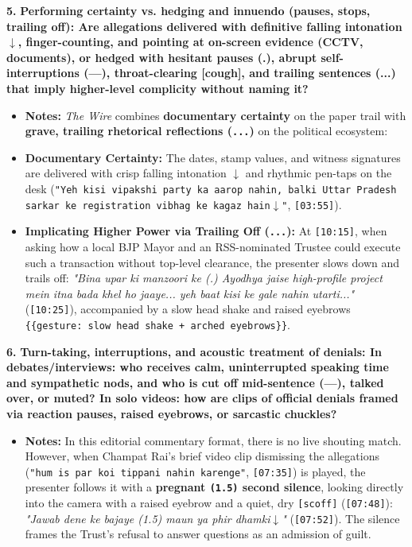 \documentclass[10pt,a4paper]{article}
\begin{document}
\noindent\textbf{5.} \textbf{Performing certainty vs. hedging and innuendo (pauses, stops, trailing off): Are allegations delivered with definitive falling intonation $\downarrow$, finger-counting, and pointing at on-screen evidence (CCTV, documents), or hedged with hesitant pauses (.), abrupt self-interruptions (---), throat-clearing [cough], and trailing sentences (...) that imply higher-level complicity without naming it?}\par\smallskip
\begin{itemize}
  \item \textbf{Notes:}
\textit{The Wire} combines \textbf{documentary certainty} on the paper trail with \textbf{grave, trailing rhetorical reflections (\texttt{...})} on the political ecosystem:\par\smallskip
  \item \textbf{Documentary Certainty:} The dates, stamp values, and witness signatures are delivered with crisp falling intonation \texttt{$\downarrow$} and rhythmic pen-taps on the desk (\texttt{"Yeh kisi vipakshi party ka aarop nahin, balki Uttar Pradesh sarkar ke registration vibhag ke kagaz hain$\downarrow$"}, \texttt{[03:55]}).
  \item \textbf{Implicating Higher Power via Trailing Off (\texttt{...}):} At \texttt{[10:15]}, when asking how a local BJP Mayor and an RSS-nominated Trustee could execute such a transaction without top-level clearance, the presenter slows down and trails off: \textit{"Bina upar ki manzoori ke (.) Ayodhya jaise high-profile project mein itna bada khel ho jaaye... yeh baat kisi ke gale nahin utarti..."} (\texttt{[10:25]}), accompanied by a slow head shake and raised eyebrows \texttt{\{\{gesture: slow head shake + arched eyebrows\}\}}.
\end{itemize}

\noindent\textbf{6.} \textbf{Turn-taking, interruptions, and acoustic treatment of denials: In debates/interviews: who receives calm, uninterrupted speaking time and sympathetic nods, and who is cut off mid-sentence (---), talked over, or muted? In solo videos: how are clips of official denials framed via reaction pauses, raised eyebrows, or sarcastic chuckles?}\par\smallskip
\begin{itemize}
  \item \textbf{Notes:}
In this editorial commentary format, there is no live shouting match. However, when Champat Rai's brief video clip dismissing the allegations (\texttt{"hum is par koi tippani nahin karenge"}, \texttt{[07:35]}) is played, the presenter follows it with a \textbf{pregnant \texttt{(1.5)} second silence}, looking directly into the camera with a raised eyebrow and a quiet, dry \texttt{[scoff]} (\texttt{[07:48]}): \textit{"Jawab dene ke bajaye (1.5) maun ya phir dhamki$\downarrow$"} (\texttt{[07:52]}). The silence frames the Trust's refusal to answer questions as an admission of guilt.\par\smallskip
\end{itemize}
\end{document}
